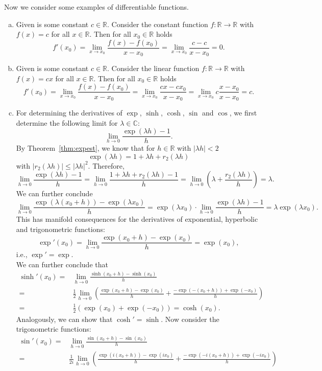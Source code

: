 Now we consider some examples of differentiable functions.

\begin{example}
\begin{enumerate}[a)]
    \item Given is some constant $c\in\mathbb{R}$. Consider the constant function $f:\mathbb{R}\to\mathbb{R}$ with $f(x)=c$ for all $x\in \mathbb{R}$. Then for all $x_0\in \mathbb{R}$ holds
\[f'(x_0)=\lim_{x\to x_0}\frac{f(x)-f(x_0)}{x-x_0}=\lim_{x\to x_0}\frac{c-c}{x-x_0}=0.\]
\item Given is some constant $c\in\mathbb{R}$. Consider the linear function $f:\mathbb{R}\to\mathbb{R}$ with $f(x)=cx$ for all $x\in \mathbb{R}$. Then for all $x_0\in \mathbb{R}$ holds
\[f'(x_0)=\lim_{x\to x_0}\frac{f(x)-f(x_0)}{x-x_0}=\lim_{x\to x_0}\frac{cx-cx_0}{x-x_0}=\lim_{x\to x_0}c\frac{x-x_0}{x-x_0}=c.\]
\item For determining the derivatives of $\exp$, $\sinh$, $\cosh$, $\sin$ and $\cos$, we first determine the following limit for
$\lambda\in\mathbb{C}$:
\[\lim_{h\to0}\frac{\exp(\lambda h)-1}{h}.\]
        By Theorem~\ref{thm:expest}, we know that for $h\in\mathbb{R}$ with $|\lambda h|<2$
\[\exp(\lambda h)=1+\lambda h+r_2(\lambda h)\]
with $|r_2(\lambda h)|\leq |\lambda h|^2$. Therefore,
\[\lim_{h\to0}\frac{\exp(\lambda h)-1}{h}=\lim_{h\to0}\frac{1+\lambda h+r_2(\lambda h)-1}{h}=\lim_{h\to0}\left(\lambda+\frac{r_2(\lambda h)}{h}\right)
 =\lambda.\]
We can further conclude
\[\lim_{h\to0}\frac{\exp(\lambda(x_0+h))-\exp(\lambda x_0)}{h}=
\exp(\lambda x_0)\cdot\lim_{h\to0}\frac{\exp(\lambda h)-1}{h}=\lambda \exp(\lambda x_0).\]
This has manifold consequences for the derivatives of exponential, hyperbolic and trigonometric functions:
\[\exp'(x_0)=\lim_{h\to0}\frac{\exp(x_0+h)-\exp(x_0)}{h}=\exp(x_0),\]
i.e., $\exp'=\exp$.\\
We can further conclude that
\[
\begin{aligned}
\sinh'(x_0)=&\lim_{h\to0}\frac{\sinh(x_0+h)-\sinh(x_0)}{h}\\=&
\frac12\lim_{h\to0}\left(\frac{\exp(x_0+h)-\exp(x_0)}{h}+\frac{-\exp(-(x_0+h))+\exp(-x_0)}{h}\right)\\
=&\frac12(\exp(x_0)+\exp(-x_0))=\cosh(x_0).
\end{aligned}
\]
Analogously, we can show that $\cosh'=\sinh$. Now consider the trigonometric functions:
\[\begin{aligned}
\sin'(x_0)=&\lim_{h\to0}\frac{\sin(x_0+h)-\sin(x_0)}{h}\\
=&\frac1{2i}\lim_{h\to0}\left(\frac{\exp(i(x_0+h))-\exp(ix_0)}{h}+\frac{-\exp(-i(x_0+h))+\exp(-ix_0)}{h}\right)\\

\end{aligned}\]
\end{enumerate}
\end{example}
